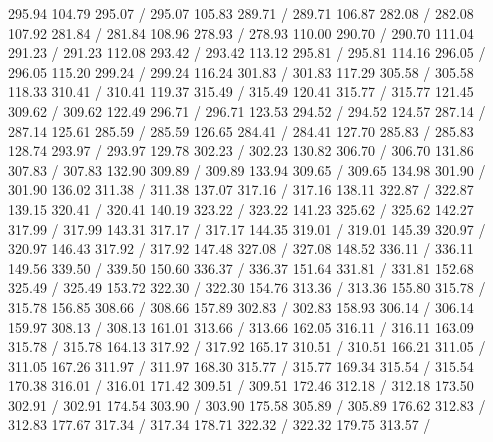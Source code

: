 { 295.94 104.79 295.07 /
 295.07 105.83 289.71 /
 289.71 106.87 282.08 /
 282.08 107.92 281.84 /
 281.84 108.96 278.93 /
 278.93 110.00 290.70 /
 290.70 111.04 291.23 /
 291.23 112.08 293.42 /
 293.42 113.12 295.81 /
 295.81 114.16 296.05 /
 296.05 115.20 299.24 /
 299.24 116.24 301.83 /
 301.83 117.29 305.58 /
 305.58 118.33 310.41 /
 310.41 119.37 315.49 /
 315.49 120.41 315.77 /
 315.77 121.45 309.62 /
 309.62 122.49 296.71 /
 296.71 123.53 294.52 /
 294.52 124.57 287.14 /
 287.14 125.61 285.59 /
 285.59 126.65 284.41 /
 284.41 127.70 285.83 /
 285.83 128.74 293.97 /
 293.97 129.78 302.23 /
 302.23 130.82 306.70 /
 306.70 131.86 307.83 /
 307.83 132.90 309.89 /
 309.89 133.94 309.65 /
 309.65 134.98 301.90 /
 301.90 136.02 311.38 /
 311.38 137.07 317.16 /
 317.16 138.11 322.87 /
 322.87 139.15 320.41 /
 320.41 140.19 323.22 /
 323.22 141.23 325.62 /
 325.62 142.27 317.99 /
 317.99 143.31 317.17 /
 317.17 144.35 319.01 /
 319.01 145.39 320.97 /
 320.97 146.43 317.92 /
 317.92 147.48 327.08 /
 327.08 148.52 336.11 /
 336.11 149.56 339.50 /
 339.50 150.60 336.37 /
 336.37 151.64 331.81 /
 331.81 152.68 325.49 /
 325.49 153.72 322.30 /
 322.30 154.76 313.36 /
 313.36 155.80 315.78 /
 315.78 156.85 308.66 /
 308.66 157.89 302.83 /
 302.83 158.93 306.14 /
 306.14 159.97 308.13 /
 308.13 161.01 313.66 /
 313.66 162.05 316.11 /
 316.11 163.09 315.78 /
 315.78 164.13 317.92 /
 317.92 165.17 310.51 /
 310.51 166.21 311.05 /
 311.05 167.26 311.97 /
 311.97 168.30 315.77 /
 315.77 169.34 315.54 /
 315.54 170.38 316.01 /
 316.01 171.42 309.51 /
 309.51 172.46 312.18 /
 312.18 173.50 302.91 /
 302.91 174.54 303.90 /
 303.90 175.58 305.89 /
 305.89 176.62 312.83 /
 312.83 177.67 317.34 /
 317.34 178.71 322.32 /
 322.32 179.75 313.57 /
}
